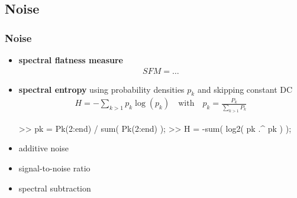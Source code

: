 
\subsection{Noise}

\begin{frame}[fragile]
	\frametitle{Noise}
	\begin{itemize}
		\item \textbf{spectral flatness measure}
			\begin{align*}
				\mathit{SFM}=\ldots
			\end{align*}
		\item \textbf{spectral entropy} using probability densities $p_k$ and skipping constant DC
			\begin{align*}
				H=-\sum_{k>1}p_k\log(p_k)\quad\textrm{with}\quad p_k=\frac{P_k}{\sum_{k>1}P_k}
			\end{align*}
			\begin{code}
>> pk = Pk(2:end) / sum( Pk(2:end) ); \color{medium}%
>> H = -sum( log2( pk .^ pk ) ); \color{medium}%
			\end{code}
		\item additive noise
		\item signal-to-noise ratio
		\item spectral subtraction
	\end{itemize}
\end{frame}


